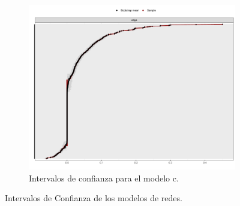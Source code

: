 \documentclass[11pt,spanish]{article}\usepackage[]{graphicx}\usepackage[]{color}
\begin{document}
\begin{figure}[ht]
\hfill
\begin{subfigure}{0.6\textwidth}
    \includegraphics[width=\textwidth]{images/interval_todos.pdf}
    \caption{Intervalos de confianza para el modelo c.}
    \label{fig:interval_todo}
\end{subfigure}
\caption{Intervalos de Confianza de los modelos de redes.}
\label{fig:intervalos}
\end{figure}
\end{document}
